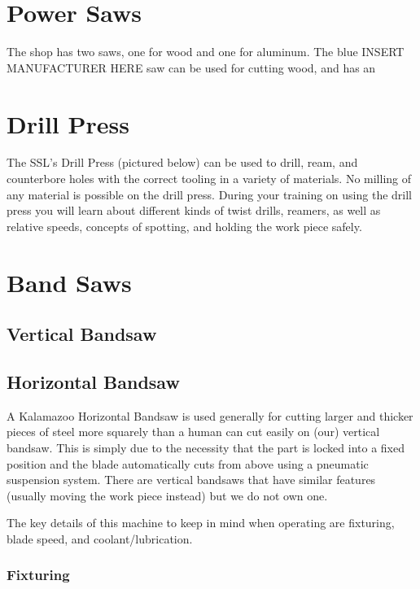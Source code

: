 \documentclass{article}
\begin{document}
\section{Power Saws}
The shop has two saws, one for wood and one for aluminum. The blue INSERT MANUFACTURER HERE saw can be used for cutting wood, and has an 

\section{Drill Press}

The SSL's Drill Press (pictured below) can be used to drill, ream, and counterbore holes with the correct tooling in a variety of materials. No milling of any material is possible on the drill press. During your training on using the drill press you will learn about different kinds of twist drills, reamers, as well as relative speeds, concepts of spotting, and holding the work piece safely. 

\section{Band Saws}

\subsection{Vertical Bandsaw}



\subsection{Horizontal Bandsaw}

A Kalamazoo Horizontal Bandsaw is used generally for cutting larger and thicker pieces of steel more squarely than a human can cut easily on (our) vertical bandsaw. This is simply due to the necessity that the part is locked into a fixed position and the blade automatically cuts from above using a pneumatic suspension system. There are vertical bandsaws that have similar features (usually moving the work piece instead) but we do not own one.

The key details of this machine to keep in mind when operating are fixturing, blade speed, and coolant/lubrication. 

\subsubsection{Fixturing}
\end{document}
